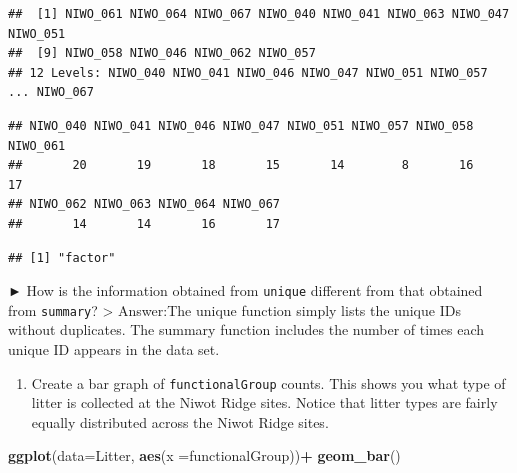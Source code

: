 \documentclass[
]{article}
\newenvironment{Shaded}{\begin{snugshade}}{\end{snugshade}}
\newcommand{\AttributeTok}[1]{\textcolor[rgb]{0.13,0.29,0.53}{#1}}
\newcommand{\CommentTok}[1]{\textcolor[rgb]{0.56,0.35,0.01}{\textit{#1}}}
\newcommand{\FunctionTok}[1]{\textcolor[rgb]{0.13,0.29,0.53}{\textbf{#1}}}
\newcommand{\NormalTok}[1]{#1}
\newcommand{\SpecialCharTok}[1]{\textcolor[rgb]{0.81,0.36,0.00}{\textbf{#1}}}
\providecommand{\tightlist}{%
  \setlength{\itemsep}{0pt}\setlength{\parskip}{0pt}}
\begin{document}
\begin{verbatim}
##  [1] NIWO_061 NIWO_064 NIWO_067 NIWO_040 NIWO_041 NIWO_063 NIWO_047 NIWO_051
##  [9] NIWO_058 NIWO_046 NIWO_062 NIWO_057
## 12 Levels: NIWO_040 NIWO_041 NIWO_046 NIWO_047 NIWO_051 NIWO_057 ... NIWO_067
\end{verbatim}

\begin{Shaded}
\end{Shaded}

\begin{verbatim}
## NIWO_040 NIWO_041 NIWO_046 NIWO_047 NIWO_051 NIWO_057 NIWO_058 NIWO_061 
##       20       19       18       15       14        8       16       17 
## NIWO_062 NIWO_063 NIWO_064 NIWO_067 
##       14       14       16       17
\end{verbatim}

\begin{Shaded}
\end{Shaded}

\begin{verbatim}
## [1] "factor"
\end{verbatim}

► How is the information obtained from \texttt{unique} different from
that obtained from \texttt{summary}? \textgreater{} Answer:The unique
function simply lists the unique IDs without duplicates. The summary
function includes the number of times each unique ID appears in the data
set.

\begin{enumerate}
\def\labelenumi{\arabic{enumi}.}
\setcounter{enumi}{13}
\tightlist
\item
  Create a bar graph of \texttt{functionalGroup} counts. This shows you
  what type of litter is collected at the Niwot Ridge sites. Notice that
  litter types are fairly equally distributed across the Niwot Ridge
  sites.
\end{enumerate}

\begin{Shaded}
\begin{Highlighting}[]
\FunctionTok{ggplot}\NormalTok{(}\AttributeTok{data=}\NormalTok{Litter, }\FunctionTok{aes}\NormalTok{(}\AttributeTok{x =}\NormalTok{functionalGroup))}\SpecialCharTok{+}
  \FunctionTok{geom\_bar}\NormalTok{()}
\end{Highlighting}
\end{Shaded}
\end{document}
